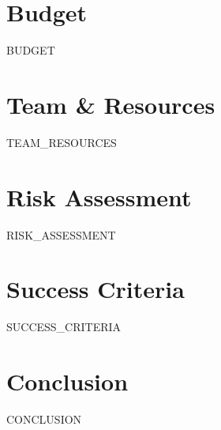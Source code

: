 \documentclass[11pt,a4paper]{article}
\begin{document}
\section*{Budget}
{{BUDGET}}

\section*{Team \& Resources}
{{TEAM_RESOURCES}}

\section*{Risk Assessment}
{{RISK_ASSESSMENT}}

\section*{Success Criteria}
{{SUCCESS_CRITERIA}}

\section*{Conclusion}
{{CONCLUSION}}
\end{document}
